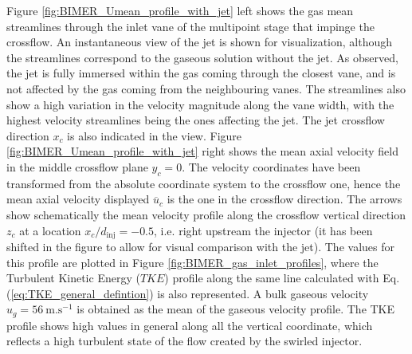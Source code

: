 Figure \ref{fig:BIMER_Umean_profile_with_jet} left shows the gas mean streamlines through the inlet vane of the multipoint stage that impinge the crossflow. An instantaneous view of the jet is shown for visualization, although the streamlines correspond to the gaseous solution without the jet. As observed, the jet is fully immersed within the gas coming through the closest vane, and is not affected by the gas coming from the neighbouring vanes. The streamlines also show a high variation in the velocity magnitude along the vane width, with the highest velocity streamlines being the ones affecting the jet. The jet crossflow direction $x_c$ is also indicated in the view. Figure \ref{fig:BIMER_Umean_profile_with_jet} right shows the mean axial velocity field in the middle crossflow plane $y_c = 0$. The velocity coordinates have been transformed from the absolute coordinate system to the crossflow one, hence the mean axial velocity displayed $\overline{u}_c$ is the one in the crossflow direction. The arrows show schematically the mean velocity profile along the crossflow vertical direction $z_c$ at a location $x_c/d_\mathrm{inj} = -0.5$, i.e. right upstream the injector (it has been shifted in the figure to allow for visual comparison with the jet). The values for this profile are plotted in Figure \ref{fig:BIMER_gas_inlet_profiles}, where the Turbulent Kinetic Energy ($TKE$) profile along the same line calculated with Eq. (\ref{eq:TKE_general_defintion}) is also represented. A bulk gaseous velocity $u_g = 56 ~\mathrm{m}.\mathrm{s}^{-1}$ is obtained as the mean of the gaseous velocity profile. The TKE profile shows high values in general along all the vertical coordinate, which reflects a high turbulent state of the flow created by the swirled injector. %





